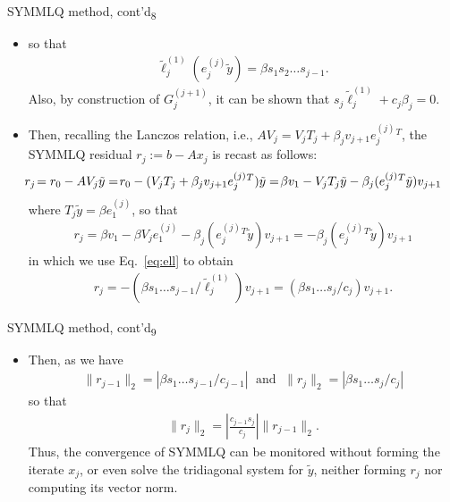 \documentclass[t,usepdftitle=false]{beamer}
\begin{document}
\begin{frame}{SYMMLQ method, cont'd\textsubscript{8}}
\begin{itemize}
\item[]so that
\begin{align}\label{eq:ell}
\tilde{\ell}_j^{(1)}(e_j^{(j)}\tilde{y})=\beta s_1s_2\dots s_{j-1}.
\end{align}
Also, by construction of $G_j^{(j+1)}$, it can be shown that $s_j\tilde{\ell}_j^{(1)}+c_j\beta_j=0$.
\item[] Then, recalling the Lanczos relation, i.e., $AV_j=V_jT_j+\beta_j v_{j+1}e_j^{(j)}{}^T$, the SYMMLQ residual $r_j:=b-Ax_j$ is recast as follows:
\begin{align*}
\hspace{-.55cm}
r_j\!=r_0-AV_j\tilde{y}=\!
r_0-(V_jT_j+\beta_j v_{j+1}e_j^{(j)}{}^T)\tilde{y}=\!
\beta v_1-V_jT_j\tilde{y}-\beta_j(e_j^{(j)}{}^T\tilde{y})v_{j+1}
\end{align*}
where $T_j\tilde{y}=\beta e_1^{(j)}$, so that
\begin{align*}
r_j=
\beta v_1-\beta V_je_1^{(j)}-\beta_j(e_j^{(j)}{}^T\tilde{y})v_{j+1}=
-\beta_j(e_j^{(j)}{}^T\tilde{y})v_{j+1}
\end{align*}
in which we use Eq.~\eqref{eq:ell} to obtain
\begin{align*}
r_j=
-\left(\beta s_1\dots s_{j-1}/\tilde{\ell}^{(1)}_j\right)v_{j+1}=
\left(\beta s_1\dots s_{j}/c_j\right)v_{j+1}.
\end{align*}
\end{itemize}
\end{frame}

\begin{frame}{SYMMLQ method, cont'd\textsubscript{9}}
\begin{itemize}
\item[]Then, as we have 
\begin{align*}
\|r_{j-1}\|_2=|\beta s_1\dots s_{j-1}/c_{j-1}|
\;\text{ and }\;
\|r_j\|_2=|\beta s_1\dots s_{j}/c_j|
\end{align*}
so that
\begin{align*}
\|r_j\|_2=\left|\frac{c_{j-1}s_j}{c_j}\right|\|r_{j-1}\|_2.
\end{align*} 
Thus, the convergence of SYMMLQ can be monitored without forming the iterate $x_j$, or even solve the tridiagonal system for $\tilde{y}$, neither forming $r_j$ nor computing its vector norm.
\end{itemize}
\end{frame}
\end{document}
